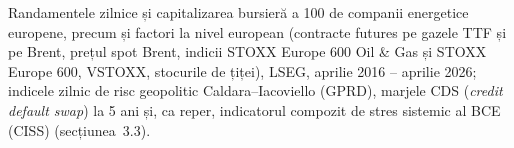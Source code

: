 \textbf{} %
{Randamentele zilnice și capitalizarea bursieră a 100 de companii energetice europene, precum și factori la nivel european (contracte futures pe gazele TTF și pe Brent, prețul spot Brent, indicii STOXX Europe 600 Oil \& Gas și STOXX Europe 600, VSTOXX, stocurile de țiței), LSEG, aprilie 2016 -- aprilie 2026;
indicele zilnic de risc geopolitic Caldara--Iacoviello (GPRD), marjele CDS (\emph{credit default swap}) la 5 ani și, ca reper, indicatorul compozit de stres sistemic al BCE (CISS) (secțiunea~3.3).}

